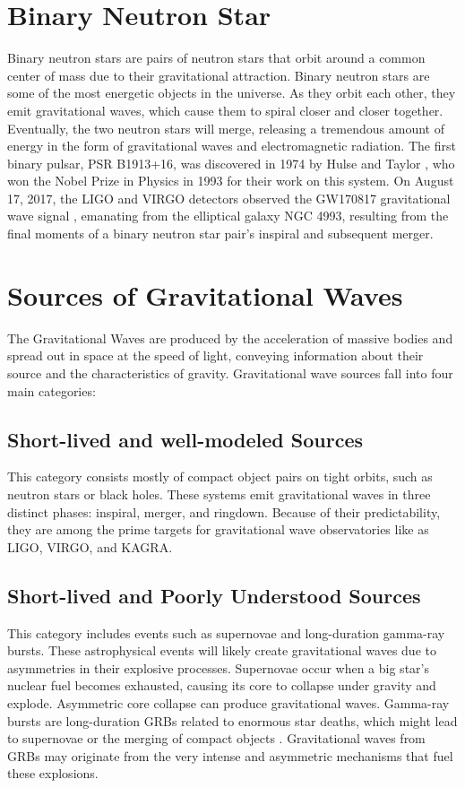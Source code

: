 \section{Binary Neutron Star}
Binary neutron stars are pairs of neutron stars that orbit around a common center of mass due to their gravitational attraction. Binary neutron stars are some of the most energetic objects in the universe. As they orbit each other, they emit gravitational waves, which cause them to spiral closer and closer together. Eventually, the two neutron stars will merge, releasing a tremendous amount of energy in the form of gravitational waves and electromagnetic radiation. The first binary pulsar, PSR B1913+16, was discovered in 1974 by Hulse and Taylor \citep{1975ApJ...195L..51H}, who won the Nobel Prize in Physics in 1993 for their work on this system. On August 17, 2017, the LIGO and VIRGO detectors observed the GW170817  gravitational wave signal \citep{2017ApJ...848L..12A}, emanating from the elliptical galaxy NGC 4993, resulting from the final moments of a binary neutron star pair's inspiral and subsequent merger.

\section{Sources of Gravitational Waves}
The Gravitational Waves are produced by the acceleration of massive bodies and spread out in space at the speed of light, conveying information about their source and the characteristics of gravity. 
Gravitational wave sources fall into four main categories:
\vspace{0.2cm}

\subsection{Short-lived and well-modeled Sources}
This category consists mostly of compact object pairs on tight orbits, such as neutron stars or black holes. These systems emit gravitational waves in three distinct phases: inspiral, merger, and ringdown. Because of their predictability, they are among the prime targets for gravitational wave observatories like as LIGO, VIRGO, and KAGRA.
\vspace{0.2cm}

\subsection{Short-lived and Poorly Understood Sources}
This category includes events such as supernovae and long-duration gamma-ray bursts. These astrophysical events will likely create gravitational waves due to asymmetries in their explosive processes. Supernovae occur when a big star's nuclear fuel becomes exhausted, causing its core to collapse under gravity and explode. Asymmetric core collapse can produce gravitational waves. Gamma-ray bursts are long-duration GRBs related to enormous star deaths, which might lead to supernovae or the merging of compact objects \citep{nasaGammaRayBursts2023}\citep{Troja2022-bo}. Gravitational waves from GRBs may originate from the very intense and asymmetric mechanisms that fuel these explosions.
\vspace{0.2cm}

